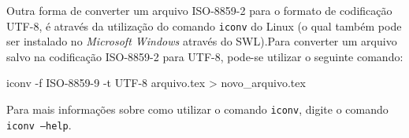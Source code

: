 \begin{figure}[H]
\begin{center}
    \end{center}
\vspace{4mm}
\label{fig:leiame}
\end{figure}

Outra forma de converter um arquivo ISO-8859-2 para o formato de codificação UTF-8, é através da utilização do comando {\tt iconv} do Linux (o qual também pode ser instalado no \textit{Microsoft Windows} através do SWL).Para converter um arquivo salvo na codificação ISO-8859-2 para UTF-8, pode-se utilizar o seguinte comando:

\begin{meucomando}
iconv -f ISO-8859-9 -t UTF-8 arquivo.tex > novo_arquivo.tex
\end{meucomando}

\begin{marker}
Para mais informações sobre como utilizar o comando {\tt iconv}, digite o comando {\tt iconv --help}.
\end{marker}

